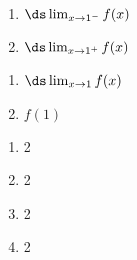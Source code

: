{
\noindent\begin{minipage}{\linewidth}\centering
{}
\end{minipage}

\noindent\begin{minipage}[t]{.5\linewidth}
\begin{enumerate}
\item		$\ds \lim_{x\to 1^-} f(x)$
\item		$\ds \lim_{x\to 1^+} f(x)$
\end{enumerate}
\end{minipage}
\noindent\begin{minipage}[t]{.5\linewidth}
\begin{enumerate}\addtocounter{enumii}{2}
\item		$\ds \lim_{x\to 1} f(x)$
\item		$f(1)$
\end{enumerate}
\end{minipage}
}
{\begin{enumerate}
\item		2
\item		2
\item		2
\item		2
\end{enumerate}
}



